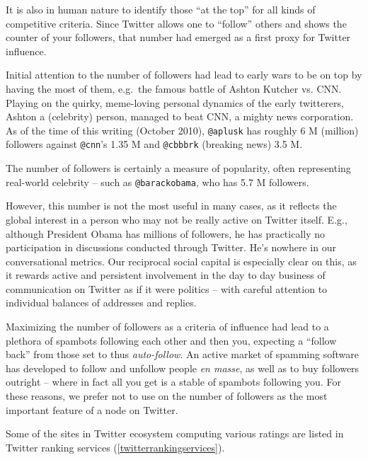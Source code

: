 \documentclass[10pt,oneside]{memoir}
\begin{document}
\begin{Spacing}{2}
It is also in human nature to identify those ``at the top'' for all kinds of competitive criteria.  Since Twitter allows one to ``follow'' others and shows the counter of your followers, that number had emerged as a first proxy for Twitter influence.  


Initial attention to the number of followers had lead to early wars to be on top by having the most of them, e.g.\ the famous battle of Ashton Kutcher vs. CNN.  Playing on the quirky, meme-loving personal dynamics of the early twitterers, Ashton a (celebrity) person, managed to beat CNN, a mighty news corporation.  As of the time of this writing (October 2010), \texttt{@aplusk} has roughly 6 M (million) followers against \texttt{@cnn}'s 1.35 M and \texttt{@cbbbrk} (breaking news) 3.5 M.


The number of followers is certainly a measure of popularity, often representing real-world celebrity -- such as \texttt{@barackobama}, who has 5.7 M followers. 


However, this number is not the most useful in many cases, as it reflects the global interest in a person who may not be really active on Twitter itself.  E.g., although President Obama has millions of followers,  he has practically no participation in discussions conducted through Twitter.  He's nowhere in our conversational metrics.  Our reciprocal social capital is especially clear on this, as it rewards active and persistent involvement in the day to day business of communication on Twitter as if it were politics -- with careful attention to individual balances of addresses and replies.


Maximizing the number of followers as a  criteria of influence had lead to a plethora of spambots following each other and then you, expecting a ``follow back'' from those set to thus {\itshape auto-follow}.  An active market of spamming software has developed to follow and unfollow people {\itshape en masse}, as well as to buy followers outright -- where in fact all you get is a stable of spambots following you.  For these reasons, we prefer not to use on the number of followers as the most important feature of a node on Twitter.


Some of the sites in Twitter ecosystem computing various ratings are listed in Twitter ranking services (\autoref{twitterrankingservices}).



\end{Spacing}
\end{document}
